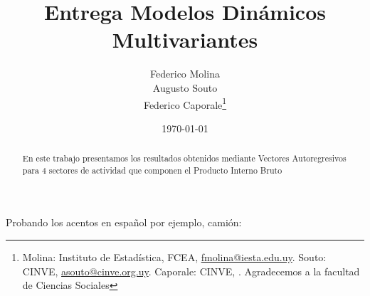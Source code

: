 \documentclass[AER]{AEA}
\begin{document}
\title{Entrega Modelos Dinámicos Multivariantes}


\author{
  Federico Molina\\
  Augusto Souto\\
  Federico Caporale\thanks{
  Molina: Instituto de Estadística, FCEA, \href{mailto:fmolina@iesta.edu.uy}{fmolina@iesta.edu.uy}.
  Souto: CINVE, \href{mailto:asouto@cinve.org.uy}{asouto@cinve.org.uy}.
  Caporale: CINVE, \href{mailto:}{}.
  Agradecemos a la facultad de Ciencias Sociales
}
}

\date{\today}
\pubVolume{}
\pubIssue{}
\JEL{}

\begin{abstract}
En este trabajo presentamos los resultados obtenidos mediante Vectores
Autoregresivos para 4 sectores de actividad que componen el Producto
Interno Bruto
\end{abstract}


\maketitle



Probando los acentos en español por ejemplo, camión:
\end{document}
